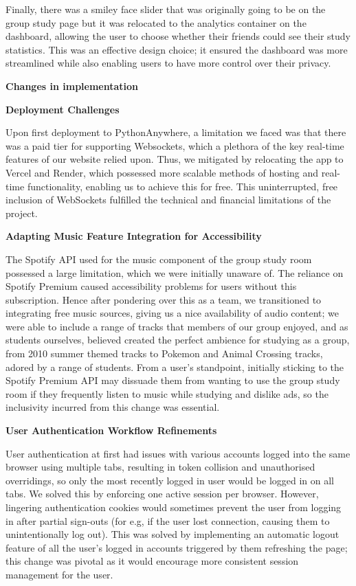 Finally, there was a smiley face slider that was originally going to be on the group study page but it was relocated to the analytics container on the dashboard, allowing the user to choose whether their friends could see their study statistics. This was an effective design choice; it ensured the dashboard was more streamlined while also enabling users to have more control over their privacy. 

\textbf{Changes in implementation}

\textbf{Deployment Challenges} 

Upon first deployment to PythonAnywhere, a limitation we faced was that there was a paid tier for supporting Websockets, which a plethora of the key real-time features of our website relied upon. Thus, we mitigated by relocating the app to Vercel and Render, which possessed more scalable methods of hosting and real-time functionality, enabling us to achieve this for free. This uninterrupted, free inclusion of WebSockets fulfilled the technical and financial limitations of the project.

\textbf{Adapting Music Feature Integration for Accessibility}

The Spotify API used for the music component of the group study room possessed a large limitation, which we were initially unaware of. The reliance on Spotify Premium caused accessibility problems for users without this subscription. Hence after pondering over this as a team, we transitioned to integrating free music sources, giving us a nice availability of audio content; we were able to include a range of tracks that members of our group enjoyed, and as students ourselves, believed created the perfect ambience for studying as a group, from 2010 summer themed tracks to Pokemon and Animal Crossing tracks, adored by a range of students. From a user's standpoint, initially sticking to the Spotify Premium API may dissuade them from wanting to use the group study room if they frequently listen to music while studying and dislike ads, so the inclusivity incurred from this change was essential.

\textbf{User Authentication Workflow Refinements}

User authentication at first had issues with various accounts logged into the same browser using multiple tabs, resulting in token collision and unauthorised overridings, so only the most recently logged in user would be logged in on all tabs. We solved this by enforcing one active session per browser. However, lingering authentication cookies would sometimes prevent the user from logging in after partial sign-outs (for e.g, if the user lost connection, causing them to unintentionally log out). This was solved by implementing an automatic logout feature of all the user's logged in accounts triggered by them refreshing the page; this change was pivotal as it would encourage more consistent session management for the user.

